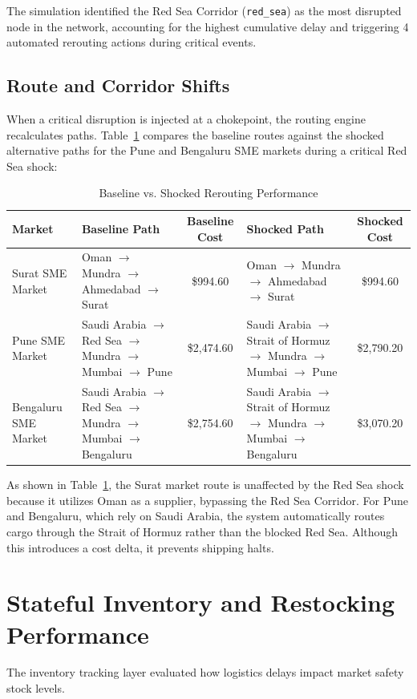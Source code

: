 The simulation identified the Red Sea Corridor (\texttt{red\_sea}) as the most disrupted node in the network, accounting for the highest cumulative delay and triggering 4 automated rerouting actions during critical events.

\subsection{Route and Corridor Shifts}
When a critical disruption is injected at a chokepoint, the routing engine recalculates paths. Table~\ref{c5:tab_routes} compares the baseline routes against the shocked alternative paths for the Pune and Bengaluru SME markets during a critical Red Sea shock:

\begin{table}[htb]
\fontsize{10}{12}\selectfont
\centering
\caption{Baseline vs. Shocked Rerouting Performance}
\label{c5:tab_routes}
\begin{tabular}{|p{2.5cm}|p{4.5cm}|c|p{4.5cm}|c|}
\hline
\textbf{Market} & \textbf{Baseline Path} & \textbf{Baseline Cost} & \textbf{Shocked Path} & \textbf{Shocked Cost} \\
\hline
Surat SME Market & Oman $\to$ Mundra $\to$ Ahmedabad $\to$ Surat & \$994.60 & Oman $\to$ Mundra $\to$ Ahmedabad $\to$ Surat & \$994.60 \\
\hline
Pune SME Market & Saudi Arabia $\to$ Red Sea $\to$ Mundra $\to$ Mumbai $\to$ Pune & \$2,474.60 & Saudi Arabia $\to$ Strait of Hormuz $\to$ Mundra $\to$ Mumbai $\to$ Pune & \$2,790.20 \\
\hline
Bengaluru SME Market & Saudi Arabia $\to$ Red Sea $\to$ Mundra $\to$ Mumbai $\to$ Bengaluru & \$2,754.60 & Saudi Arabia $\to$ Strait of Hormuz $\to$ Mundra $\to$ Mumbai $\to$ Bengaluru & \$3,070.20 \\
\hline
\end{tabular}
\end{table}

As shown in Table~\ref{c5:tab_routes}, the Surat market route is unaffected by the Red Sea shock because it utilizes Oman as a supplier, bypassing the Red Sea Corridor. For Pune and Bengaluru, which rely on Saudi Arabia, the system automatically routes cargo through the Strait of Hormuz rather than the blocked Red Sea. Although this introduces a cost delta, it prevents shipping halts.

\section{Stateful Inventory and Restocking Performance}
The inventory tracking layer evaluated how logistics delays impact market safety stock levels.

